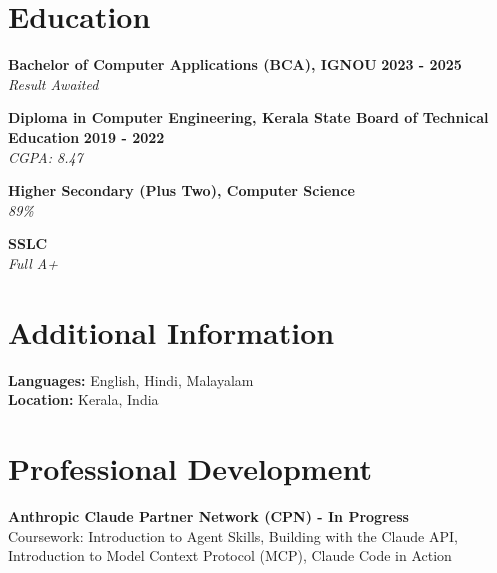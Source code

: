 \documentclass[10pt,a4paper]{article}
\begin{document}
\section*{Education}

\textbf{Bachelor of Computer Applications (BCA), IGNOU} \hfill \textbf{2023 - 2025} \\
\textit{Result Awaited}

\vspace{1pt}
\textbf{Diploma in Computer Engineering, Kerala State Board of Technical Education} \hfill \textbf{2019 - 2022} \\
\textit{CGPA: 8.47}

\vspace{1pt}
\textbf{Higher Secondary (Plus Two), Computer Science} \\
\textit{89\%}

\vspace{1pt}
\textbf{SSLC} \\
\textit{Full A+}

\section*{Additional Information}

\textbf{Languages:} English, Hindi, Malayalam \\
\textbf{Location:} Kerala, India

\section*{Professional Development}

\textbf{Anthropic Claude Partner Network (CPN) - In Progress} \\
Coursework: Introduction to Agent Skills, Building with the Claude API, Introduction to Model Context Protocol (MCP), Claude Code in Action
\end{document}
